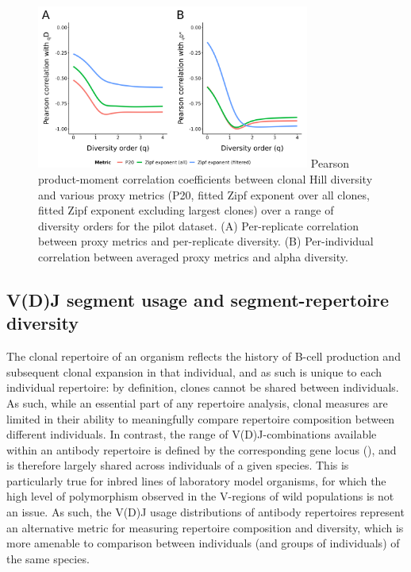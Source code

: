 \begin{figure}
\centering
\begin{subfigure}{0em}
\label{fig:igseq-pilot-clone-diversity-metrics-cor-rep}
\end{subfigure}
\begin{subfigure}{0em}
\label{fig:igseq-pilot-clone-diversity-metrics-cor-alpha}
\end{subfigure}
\includegraphics[width = 0.8\textwidth]{_Figures/png/pilot-clone-diversity-metrics-cor}
{Pearson product-moment correlation coefficients between clonal Hill diversity and various proxy metrics (P20, fitted Zipf exponent over all clones, fitted Zipf exponent excluding largest clones) over a range of diversity orders for the \igseq pilot dataset. (A) Per-replicate correlation between proxy metrics and per-replicate diversity. (B) Per-individual correlation between averaged proxy metrics and alpha diversity.}
\label{fig:igseq-pilot-clone-diversity-metrics-cor}
\end{figure}


\subsection{V(D)J segment usage and segment-repertoire diversity}
\label{sec:igseq_pilot_segments}

The clonal repertoire of an organism reflects the history of \naive B-cell production and subsequent clonal expansion in that individual, and as such is unique to each individual repertoire: by definition, clones cannot be shared between individuals. As such, while an essential part of any repertoire analysis, clonal measures are limited in their ability to meaningfully compare repertoire composition between different individuals. In contrast, the range of V(D)J-combinations available within an antibody repertoire is defined by the corresponding gene locus (), and is therefore largely shared across individuals of a given species. This is particularly true for inbred lines of laboratory model organisms, for which the high level of polymorphism observed in the V-regions of wild populations \parencite{gadalamaria2015tigger,corcoran2016igdiscover} is not an issue. As such, the V(D)J usage distributions of antibody repertoires represent an alternative metric for measuring repertoire composition and diversity, which is more amenable to comparison between individuals (and groups of individuals) of the same species.

